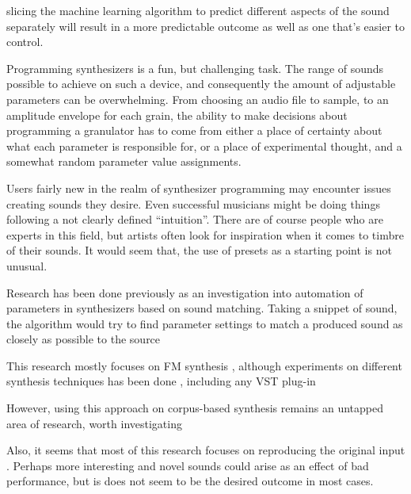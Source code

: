 slicing the machine learning algorithm to predict different aspects of the sound
separately will result in a more predictable outcome as well as one that's
easier to control.




\iffalse
Programming synthesizers is a fun, but challenging task. The range of sounds possible to
achieve on such a device, and consequently the amount of adjustable parameters can be overwhelming.
From choosing an audio file to sample, to an amplitude envelope for each grain, the ability to make
decisions about programming a granulator has to come from either a place of certainty about what
each parameter is responsible for, or a place of experimental thought, and a somewhat random
parameter value assignments.

Users fairly new in the realm of synthesizer programming may encounter issues creating sounds they
desire. Even successful musicians might be doing things following a not clearly defined “intuition”.
There are of course people who are experts in this field, but artists often look for inspiration
when it comes to timbre of their sounds.
It would seem that, the use of presets as a starting point is not unusual.


Research has been done previously as an investigation into automation of parameters in synthesizers
based on sound matching. Taking a snippet of sound, the algorithm would try to
find parameter settings to match a produced sound as closely as possible to the
source%

This research mostly focuses on FM synthesis
, although
experiments on different synthesis techniques has been
done
, including any VST
plug-in

However, using this approach on corpus-based synthesis remains an untapped area
of research, worth investigating

Also, it seems that most of this research focuses on reproducing the original
input
. Perhaps more interesting and novel sounds
could arise as an effect of bad performance, but is does not seem to be the
desired outcome in most cases.



